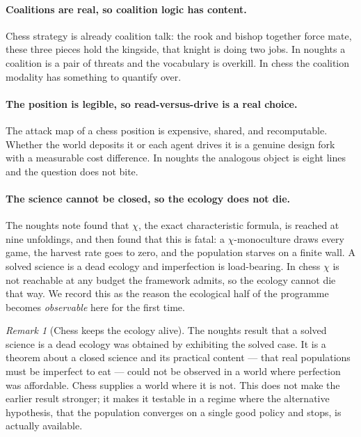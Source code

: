 \documentclass[11pt,a4paper]{article}
\theoremstyle{plain}
\theoremstyle{definition}
\theoremstyle{remark}
\newtheorem{remark}[theorem]{Remark}
\begin{document}
\paragraph{Coalitions are real, so coalition logic has content.} Chess strategy
is already coalition talk: the rook and bishop together force mate, these three
pieces hold the kingside, that knight is doing two jobs. In noughts a coalition
is a pair of threats and the vocabulary is overkill. In chess the coalition
modality has something to quantify over.

\paragraph{The position is legible, so read-versus-drive is a real choice.} The
attack map of a chess position is expensive, shared, and recomputable. Whether
the world deposits it or each agent drives it is a genuine design fork with a
measurable cost difference. In noughts the analogous object is eight lines and
the question does not bite.

\paragraph{The science cannot be closed, so the ecology does not die.} The
noughts note found that $\chi$, the exact characteristic formula, is reached at
nine unfoldings, and then found that this is fatal: a $\chi$-monoculture draws
every game, the harvest rate goes to zero, and the population starves on a
finite wall. A solved science is a dead ecology and imperfection is load-bearing.
In chess $\chi$ is not reachable at any budget the framework admits, so the
ecology cannot die that way. We record this as the reason the ecological half of
the programme becomes \emph{observable} here for the first time.

\begin{remark}[Chess keeps the ecology alive]
\label{rem:alive}
The noughts result that a solved science is a dead ecology was obtained by
exhibiting the solved case. It is a theorem about a closed science and its
practical content --- that real populations must be imperfect to eat --- could
not be observed in a world where perfection was affordable. Chess supplies a
world where it is not. This does not make the earlier result stronger; it makes
it testable in a regime where the alternative hypothesis, that the population
converges on a single good policy and stops, is actually available.
\end{remark}
\end{document}
